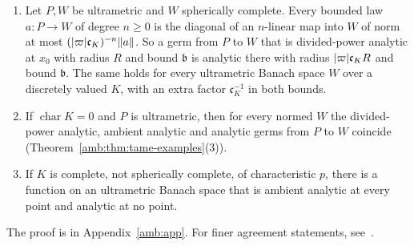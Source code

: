 \begin{proposition}\label{amb:prop:agreement}
\begin{enumerate}
\item Let $P,W$ be ultrametric and $W$ spherically complete. Every bounded law $a\colon P\to W$ of degree $n\ge0$ is the diagonal of an $n$-linear map into $W$ of norm at most $(\lvert \varpi\rvert\mathfrak c_K)^{-n}\lVert a\rVert$. So a germ from $P$ to $W$ that is divided-power analytic at $x_0$ with radius $R$ and bound $\mathfrak b$ is analytic there with radius $\lvert \varpi\rvert\mathfrak c_KR$ and bound $\mathfrak b$. The same holds for every ultrametric Banach space $W$ over a discretely valued $K$, with an extra factor $\mathfrak c_K^{-1}$ in both bounds.
\item If $\operatorname{char}K=0$ and $P$ is ultrametric, then for every normed $W$ the divided-power analytic, ambient analytic and analytic germs from $P$ to $W$ coincide (Theorem~\ref{amb:thm:tame-examples}(3)).
\item If $K$ is complete, not spherically complete, of characteristic $p$, there is a function on an ultrametric Banach space that is ambient analytic at every point and analytic at no point.
\end{enumerate}
\end{proposition}
The proof is in Appendix~\ref{amb:app}. For finer agreement statements, see~\cite{II}.

